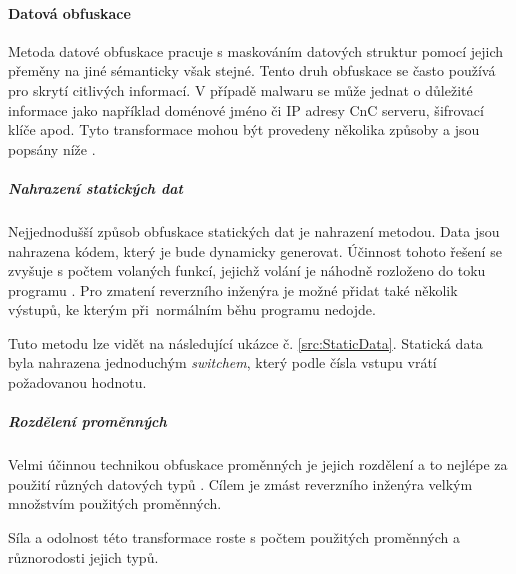 \paragraph*{Datová obfuskace}

Metoda datové obfuskace pracuje s maskováním datových struktur pomocí jejich přeměny na jiné sémanticky však stejné. Tento druh obfuskace se často používá pro skrytí citlivých informací. V případě malwaru se může jednat o důležité informace jako například doménové jméno či IP adresy CnC serveru, šifrovací klíče apod. Tyto transformace mohou být provedeny několika způsoby a jsou popsány níže \cite{DataObfuscation}.

\subparagraph*{Nahrazení statických dat}

Nejjednodušší způsob obfuskace statických dat je nahrazení metodou. Data jsou nahrazena kódem, který je bude dynamicky generovat. Účinnost tohoto řešení se zvyšuje s počtem volaných funkcí, jejichž volání je náhodně rozloženo do toku programu \cite{DataObfuscation}. Pro zmatení reverzního inženýra je možné přidat také několik výstupů, ke kterým při~normálním běhu programu nedojde.

Tuto metodu lze vidět na následující ukázce č. \ref{src:StaticData}. Statická data byla nahrazena jednoduchým \emph{switchem}, který podle čísla vstupu vrátí požadovanou hodnotu.

\noindent
\begin{minipage}[t]{1\textwidth}
    
\end{minipage}

\subparagraph*{Rozdělení proměnných}

Velmi účinnou technikou obfuskace proměnných je jejich rozdělení a to nejlépe za použití různých datových typů \cite{DataObfuscation2}. Cílem je zmást reverzního inženýra velkým množstvím použitých proměnných. \par Síla a odolnost této transformace roste s počtem použitých proměnných a různorodosti jejich typů.

